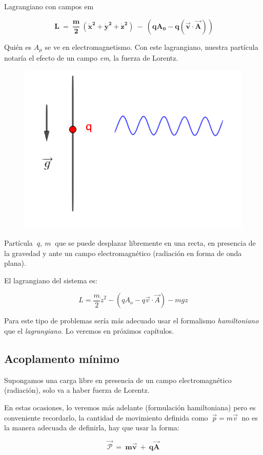  \begin{myblock}{Lagrangiano con campos em}
\begin{Large}
	\begin{equation}
	\boldsymbol{ \boxed{ \  L\ = \ \dfrac m 2 \ (\dot x^2 + \dot y^2 + \dot z^2) \ -\ \left( qA_0 - q(\vec v \cdot \overrightarrow A )\right) }}	
	\end{equation}
\end{Large}	
\end{myblock}

Quién es $A_\mu$ se ve en electromagnetismo. Con este lagrangiano, nuestra partícula notaría el efecto de un campo \emph{em}, la fuerza de Lorentz.


\begin{example}
 
	\begin{multicols}{2}
	\begin{figure}[H]
		\centering
		\includegraphics[width=.35\textwidth]{imagenes/img07-01.png}
	\end{figure}
	Partícula $\ q,\ m \ $ que se puede desplazar libremente en una recta, en presencia de la gravedad y ante un campo electromagnético (radiación en forma de onda plana).
	
	El lagrangiano del sistema es:
	
	$$L = \dfrac m 2 \dot z^2 - (qA_o-q\vec v \cdot \overrightarrow A) - mgz$$
	\end{multicols}
\end{example}

Para este tipo de problemas sería más adecuado usar el formalismo \emph{hamiltoniano} que el 	\emph{lagrangiano}. Lo veremos en próximos capítulos.

\subsection{Acoplamento mínimo}

\vspace{0.5cm}


Supongamos una carga libre en presencia de un campo electromagnético (radiación), solo va a haber fuerza de Lorentz.

En estas ocasiones, lo veremos más adelante (formulación hamiltoniana) pero es conveniente recordarlo, la cantidad de movimiento definida como $\ \vec p = m \vec v \ $ no es la manera adecuada de definirla, hay que usar la forma:

$$\boxed{ \ \boldsymbol{ \overrightarrow {\mathcal P} \ = \ m\vec v \ + \  q\overrightarrow A} \ }$$